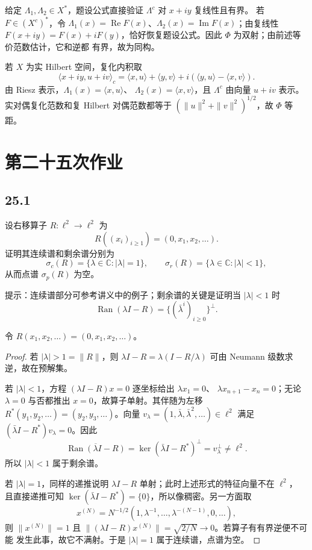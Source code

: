 给定 $\Lambda_1,\Lambda_2\in X^*$，题设公式直接验证 $\Lambda^c$ 对 $x+iy$ 复线性且有界。
若 $F\in(X^c)^*$，令
$\Lambda_1(x)=\operatorname{Re}F(x)$、$\Lambda_2(x)=\operatorname{Im}F(x)$；由复线性
$F(x+iy)=F(x)+iF(y)$，恰好恢复题设公式。因此 $\Phi$ 为双射；由前述等价范数估计，它和逆都
有界，故为同构。

若 $X$ 为实 Hilbert 空间，复化内积取
\[
 \langle x+iy,u+iv\rangle_c
 =\langle x,u\rangle+\langle y,v\rangle
 +i(\langle y,u\rangle-\langle x,v\rangle).
\]
由 Riesz 表示，$\Lambda_1(x)=\langle x,u\rangle$、
$\Lambda_2(x)=\langle x,v\rangle$，且 $\Lambda^c$ 由向量 $u+iv$ 表示。实对偶复化范数和复
Hilbert 对偶范数都等于 $(\|u\|^2+\|v\|^2)^{1/2}$，故 $\Phi$ 等距。

\section{第二十五次作业}

\subsection*{25.1}
\begin{problem}
设右移算子 $R:\ell^2\to\ell^2$ 为
\[
 R((x_i)_{i\geq1})=(0,x_1,x_2,\ldots).
\]
证明其连续谱和剩余谱分别为
\[
 \sigma_c(R)=\{\lambda\in\mathbb C:|\lambda|=1\},\qquad
 \sigma_r(R)=\{\lambda\in\mathbb C:|\lambda|<1\},
\]
从而点谱 $\sigma_p(R)$ 为空。

提示：连续谱部分可参考讲义中的例子；剩余谱的关键是证明当 $|\lambda|<1$ 时
\[
 \operatorname{Ran}(\lambda I-R)
 =\{(\bar\lambda^i)_{i\geq0}\}^{\perp}.
\]
\end{problem}

令 $R(x_1,x_2,\ldots)=(0,x_1,x_2,\ldots)$。
\begin{proof}
若 $|\lambda|>1=\|R\|$，则
$\lambda I-R=\lambda(I-R/\lambda)$ 可由 Neumann 级数求逆，故在预解集。

若 $|\lambda|<1$，方程 $(\lambda I-R)x=0$ 逐坐标给出 $\lambda x_1=0$、
$\lambda x_{n+1}-x_n=0$；无论 $\lambda=0$ 与否都推出 $x=0$，故算子单射。其伴随为左移
$R^*(y_1,y_2,\ldots)=(y_2,y_3,\ldots)$。向量
$v_\lambda=(1,\bar\lambda,\bar\lambda^2,\ldots)\in\ell^2$ 满足
$(\bar\lambda I-R^*)v_\lambda=0$。因此
\[
 \overline{\operatorname{Ran}(\lambda I-R)}
 =\ker(\bar\lambda I-R^*)^\perp=v_\lambda^\perp\neq\ell^2.
\]
所以 $|\lambda|<1$ 属于剩余谱。

若 $|\lambda|=1$，同样的递推说明 $\lambda I-R$ 单射；此时上述形式的特征向量不在 $\ell^2$，
且直接递推可知 $\ker(\bar\lambda I-R^*)=\{0\}$，所以像稠密。另一方面取
\[
 x^{(N)}=N^{-1/2}(1,\lambda^{-1},\ldots,\lambda^{-(N-1)},0,\ldots),
\]
则 $\|x^{(N)}\|=1$ 且 $\|(\lambda I-R)x^{(N)}\|=\sqrt{2/N}\to0$。若算子有有界逆便不可能
发生此事，故它不满射。于是 $|\lambda|=1$ 属于连续谱，点谱为空。
\end{proof}

